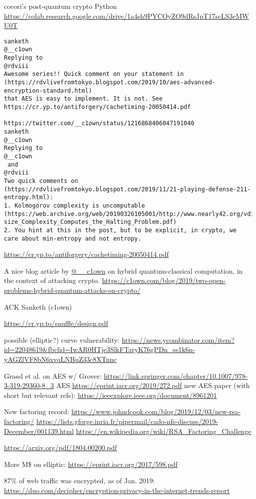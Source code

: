 \documentclass[%
 aip,
 jmp,%
 amsmath,amssymb,
 reprint,%
]{revtex4-1}
\begin{document}
cocori's post-quantum crypto Python
\url{https://colab.research.google.com/drive/1a4sh9PYCOyZO9dRsJpT17scLS3eMWU0T}

\begin{verbatim}
sanketh
@__c1own
Replying to 
@rdviii
Awesome series!! Quick comment on your statement in
(https://rdvlivefromtokyo.blogspot.com/2019/10/aes-advanced-encryption-standard.html)
that AES is easy to implement. It is not. See
https://cr.yp.to/antiforgery/cachetiming-20050414.pdf

https://twitter.com/__c1own/status/1216868406047191040
sanketh
@__c1own
Replying to 
@__c1own
 and 
@rdviii
Two quick comments on (https://rdvlivefromtokyo.blogspot.com/2019/11/21-playing-defense-211-entropy.html):
1. Kolmogorov complexity is uncomputable (https://web.archive.org/web/20190326105001/http://www.nearly42.org/vdisk/articles/Program-size_Complexity_Computes_the_Halting_Problem.pdf)
2. You hint at this in the post, but to be explicit, in crypto, we
care about min-entropy and not entropy.
\end{verbatim}

\url{https://cr.yp.to/antiforgery/cachetiming-20050414.pdf}

A nice blog article by \url{@__c1own} on hybrid quantum-classical computation, in the context of attacking crypto.
\url{https://c1own.com/blog/2019/two-open-problems-hybrid-quantum-attacks-on-crypto/}

ACK Sanketh (c1own)

\url{https://cr.yp.to/snuffle/design.pdf}

possible (elliptic?) curve vulnerability:
\url{https://news.ycombinator.com/item?id=22048619&fbclid=IwAR0HTje3SlkFTaryK76gPDn_ss1k6n-yAGZlVF8bN6xvqLNBuZ33c8XTnnc}

Grassl et al. on AES w/ Grover:
\url{https://link.springer.com/chapter/10.1007/978-3-319-29360-8_3}
AES
\url{https://eprint.iacr.org/2019/272.pdf}
new AES paper (with short but relevant refs):
\url{https://ieeexplore.ieee.org/document/8961201}

New factoring record:
\url{https://www.johndcook.com/blog/2019/12/03/new-rsa-factoring/}
\url{https://lists.gforge.inria.fr/pipermail/cado-nfs-discuss/2019-December/001139.html}
\url{https://en.wikipedia.org/wiki/RSA_Factoring_Challenge}

\url{https://arxiv.org/pdf/1804.00200.pdf}

More M\$ on elliptic:
\url{https://eprint.iacr.org/2017/598.pdf}

87\% of web traffic was encrypted, as of Jan. 2019:
\url{https://duo.com/decipher/encryption-privacy-in-the-internet-trends-report}
\end{document}
